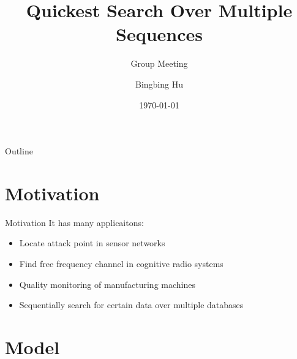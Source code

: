 \documentclass[xcolor={svgnames}]{beamer}
\title{Quickest Search Over Multiple Sequences}
\subtitle{Group Meeting}
\author{Bingbing Hu}
\institute{SIST, ShanghaiTech}
\date{\today}
\begin{document}

\begin{frame}{Outline}
\tableofcontents
\end{frame}

\section{Motivation}

\begin{frame}{Motivation}
  It has many applicaitons:
  \begin{itemize}
    \item Locate attack point in sensor networks
    \item Find free frequency channel in cognitive radio systems
    \item Quality monitoring of manufacturing machines
    \item Sequentially search for certain data over multiple databases
  \end{itemize}
\end{frame}

\section{Model}

\end{document}
